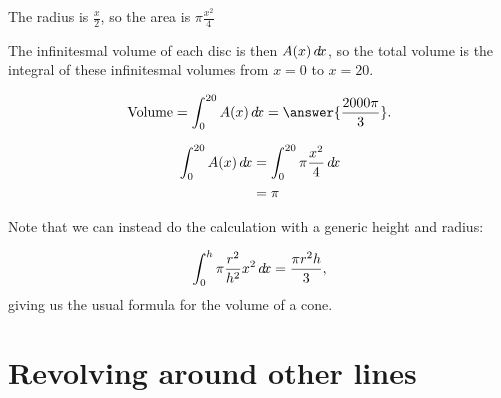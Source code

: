 \documentclass{ximera}
\begin{document}
\begin{example}
\begin{question}
\begin{hint}
	The radius is $\frac{x}{2}$, so the area is $\pi \frac{x^2}{4}$
\end{hint}
\end{question}

The infinitesmal volume of each disc is then $A(x) \mathop{}\!d\! x$, so the total volume is the integral of these infinitesmal volumes from $x = 0$ to $x = 20$.

\begin{question}
\[
\textrm{Volume} = 
  \int_0^{20} A(x) \d x=\answer{\frac{2000\pi}{3}}.
\]

\begin{hint}
	\begin{align*}
		\int_0^{20} A(x) \mathop{}\!d\! x &= \int_0^{20} \pi \frac{x^2}{4} \mathop{}\!d\! x\\ 
			&= \pi
	\end{align*}
\end{hint}
\end{question}

Note that we can instead do the calculation with a generic height and
radius: 

\[
  \int_0^{h} \pi\frac{r^2}{h^2}x^2\mathop{}\!d\! x
  = \frac{\pi r^2 h}{3},
\]
giving us the usual formula for the volume of a cone.
\end{example}


\section{Revolving around other lines}
\end{document}
